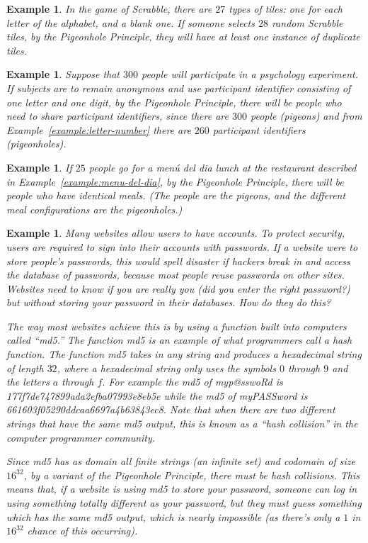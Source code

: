 \documentclass{book}
\newcounter{ekcounter}%
\theoremstyle{ekimcustom}
\newtheorem{example}[ekcounter]{Example}
\begin{document}
\begin{example}
In the game of Scrabble, there are $27$ types of tiles: one for each letter of the alphabet, and a blank one. If someone selects $28$ random Scrabble tiles, by the Pigeonhole Principle, they will have at least one instance of duplicate tiles.
\end{example}

\begin{example}
Suppose that $300$ people will participate in a psychology experiment. If subjects are to remain anonymous and use participant identifier consisting of one letter and one digit, by the Pigeonhole Principle, there will be people who need to share participant identifiers, since there are $300$ people (pigeons) and from Example~\ref{example:letter-number} there are $260$ participant identifiers (pigeonholes).
\end{example}

\begin{example}
If $25$ people go for a men\'u del dia lunch at the restaurant described in Example~\ref{example:menu-del-dia}, by the Pigeonhole Principle, there will be people who have identical meals. (The people are the pigeons, and the different meal configurations are the pigeonholes.)
\end{example}

\begin{example}
Many websites allow users to have accounts. To protect security, users are required to sign into their accounts with passwords. If a website were to store people's passwords, this would spell disaster if hackers break in and access the database of passwords, because most people reuse passwords on other sites. Websites need to know if you are really you (did you enter the right password?) but without \emph{storing} your password in their databases. How do they do this?

The way most websites achieve this is by using a function built into computers called ``md5.'' The function md5 is an example of what programmers call a hash function. The function md5 takes in any string and produces a hexadecimal string of length $32$, where a hexadecimal string only uses the symbols $0$ through $9$ and the letters $a$ through $f$. For example the md5 of myp@sswoRd is 177f7de747899ada2efba07993e8eb5e while the md5 of myPASSword is 661603f05290ddcaa6697a4b63843ec8. Note that when there are two different strings that have the same md5 output, this is known as a ``hash collision'' in the computer programmer community.

Since md5 has as domain all finite strings (an infinite set) and codomain of size $16^{32}$, by a variant of the Pigeonhole Principle, there must be hash collisions. This means that, if a website is using md5 to store your password, someone can log in using something totally different as your password, but they must guess something which has the same md5 output, which is nearly impossible (as there's only a $1$ in $16^{32}$ chance of this occurring).
\end{example}
\end{document}
